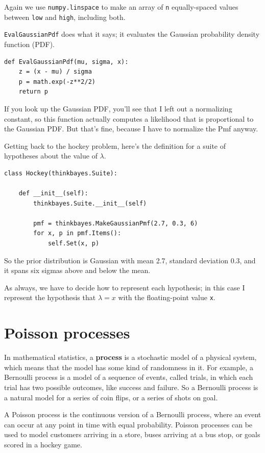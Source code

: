 \documentclass[12pt]{book}
\begin{document}
Again we use {\tt numpy.linspace} to make an array of {\tt n}
equally-spaced values between {\tt low} and {\tt high}, including
both.

\verb"EvalGaussianPdf" does what it says; it evaluates the
Gaussian probability density function (PDF).

\begin{verbatim}
def EvalGaussianPdf(mu, sigma, x):
    z = (x - mu) / sigma
    p = math.exp(-z**2/2)
    return p
\end{verbatim}  

If you look up the Gaussian PDF, you'll see that I left out a
normalizing constant, so this function actually computes
a likelihood that is proportional to the Gaussian PDF.  But
that's fine, because I have to normalize the Pmf anyway.

Getting back to the hockey problem, here's the definition for a suite
of hypotheses about the value of $\lambda$.

\begin{verbatim}
class Hockey(thinkbayes.Suite):

    def __init__(self):
        thinkbayes.Suite.__init__(self)

        pmf = thinkbayes.MakeGaussianPmf(2.7, 0.3, 6)
        for x, p in pmf.Items():
            self.Set(x, p)
\end{verbatim}  

So the prior distribution is Gaussian with mean 2.7, standard deviation
0.3, and it spans six sigmas above and below the mean.

As always, we have to decide how to represent each hypothesis; in
this case I represent the hypothesis that $\lambda=x$ with the
floating-point value {\tt x}. 


\section{Poisson processes}

In mathematical statistics, a {\bf process} is a stochastic model of a
physical system, which means that the model has some kind of
randomness in it.  For example, a Bernoulli process is a model of a
sequence of events, called trials, in which each trial has two
possible outcomes, like success and failure.  So a Bernoulli process
is a natural model for a series of coin flips, or a series of shots on
goal.   

A Poisson process is the continuous version of a Bernoulli process,
where an event can occur at any point in time with equal probability.
Poisson processes can be used to model customers arriving in a store,
buses arriving at a bus stop, or goals scored in a hockey game.
\end{document}

